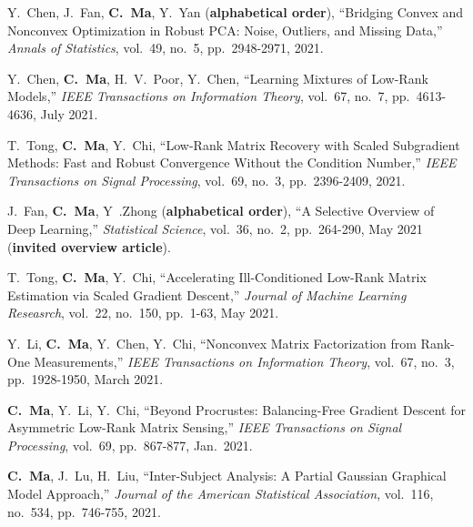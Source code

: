 \documentclass[a4paper, 10pt]{article}
\newenvironment{changemargin}[2]{%
  \begin{list}{}{%
    \setlength{\topsep}{0pt}%
    \setlength{\leftmargin}{#1}%
    \setlength{\rightmargin}{#2}%
    \setlength{\listparindent}{\parindent}%
    \setlength{\itemindent}{\parindent}%
    \setlength{\parsep}{\parskip}%
  }%
  \item[]}{\end{list}
}
\newenvironment{body} {
	\vspace*{-16pt}
	\begin{changemargin}{-0.3in}{-0.5in}
  }	
	{\end{changemargin}
}
\begin{document}
\begin{body}
\begin{enumerate}[label={[{J}{{\arabic*}}]}]
\item Y.~Chen, J.~Fan, \textbf{C.~Ma}, Y.~Yan (\textbf{alphabetical order}), {``Bridging Convex and Nonconvex Optimization in Robust PCA: Noise, Outliers, and Missing Data,''}  \emph{Annals of Statistics}, vol.~49, no.~5, pp.~2948-2971, 2021. \\

\item Y.~Chen, \textbf{C.~Ma}, H.~V.~Poor, Y.~Chen, {``Learning Mixtures of Low-Rank Models,''} \emph{IEEE Transactions on Information Theory}, vol.~67, no.~7, pp.~4613-4636, July 2021. \\






\item T.~Tong, \textbf{C.~Ma}, Y.~Chi, {``Low-Rank Matrix Recovery with Scaled Subgradient Methods: Fast and Robust Convergence Without the Condition Number,''}  \emph{IEEE Transactions on Signal Processing}, vol.~69, no.~3, pp.~2396-2409, 2021. \\







\item J.~Fan, \textbf{C.~Ma}, Y~.Zhong (\textbf{alphabetical order}), {``A Selective Overview of Deep Learning,''} \emph{Statistical Science}, vol.~36, no.~2, pp.~264-290, May 2021 (\textbf{invited overview article}).\\

\item T.~Tong, \textbf{C.~Ma}, Y.~Chi, {``Accelerating Ill-Conditioned Low-Rank Matrix Estimation via Scaled Gradient Descent,''} \emph{Journal of Machine Learning Reseasrch}, vol.~22, no.~150, pp.~1-63, May 2021. \\

\item Y.~Li, \textbf{C.~Ma}, Y.~Chen, Y.~Chi, {``Nonconvex Matrix Factorization from Rank-One Measurements,''} \emph{IEEE Transactions on Information Theory}, vol.~67, no.~3, pp.~1928-1950, March 2021.

\item \textbf{C.~Ma}, Y.~Li, Y.~Chi, {``Beyond Procrustes: Balancing-Free Gradient Descent for Asymmetric Low-Rank Matrix Sensing,''} \emph{IEEE Transactions on Signal Processing}, vol.~69, pp.~867-877, Jan.~2021.


	
\item	\textbf{C.~Ma}, J.~Lu, H.~Liu, {{``Inter-Subject Analysis: A Partial Gaussian Graphical Model Approach,''}}  \emph{Journal of the American Statistical Association}, vol.~116, no.~534, pp.~746-755, 2021. \\


\end{enumerate}
\end{body}
\end{document}
